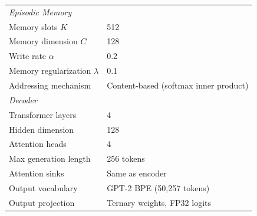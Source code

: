 \begin{longtable}{lp{6cm}}
\midrule
\multicolumn{2}{l}{\textit{Episodic Memory}} \\
\quad Memory slots $K$ & 512 \\
\quad Memory dimension $C$ & 128 \\
\quad Write rate $\alpha$ & 0.2 \\
\quad Memory regularization $\lambda$ & 0.1 \\
\quad Addressing mechanism & Content-based (softmax inner product) \\
\midrule
\multicolumn{2}{l}{\textit{Decoder}} \\
\quad Transformer layers & 4 \\
\quad Hidden dimension & 128 \\
\quad Attention heads & 4 \\
\quad Max generation length & 256 tokens \\
\quad Attention sinks & Same as encoder \\
\quad Output vocabulary & GPT-2 BPE (50{,}257 tokens) \\
\quad Output projection & Ternary weights, FP32 logits \\
\end{longtable}

